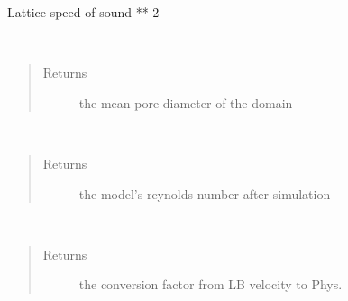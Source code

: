 \documentclass[letterpaper,10pt,english]{sphinxmanual}
\begin{document}
\begin{fulllineitems}
\begin{fulllineitems}
\end{fulllineitems}


\begin{fulllineitems}
\label{\detokenize{index:lb_colloids.LB.LB_2Dpermeability.LB2DModel.cs2}}
 \textendash{} Lattice speed of sound ** 2

\end{fulllineitems}


\begin{fulllineitems}
\label{\detokenize{index:lb_colloids.LB.LB_2Dpermeability.LB2DModel.get_mean_pore_size}}~\begin{quote}\begin{description}
\item[{Returns}] \leavevmode
the mean pore diameter of the domain

\end{description}\end{quote}

\end{fulllineitems}


\begin{fulllineitems}
\label{\detokenize{index:lb_colloids.LB.LB_2Dpermeability.LB2DModel.get_reynolds_number}}~\begin{quote}\begin{description}
\item[{Returns}] \leavevmode
the model’s reynolds number after simulation

\end{description}\end{quote}

\end{fulllineitems}


\begin{fulllineitems}
\label{\detokenize{index:lb_colloids.LB.LB_2Dpermeability.LB2DModel.get_velocity_conversion}}~\begin{quote}\begin{description}
\item[{Returns}] \leavevmode
the conversion factor from LB velocity to Phys.


\end{description}
\end{quote}
\end{fulllineitems}
\end{fulllineitems}
\end{document}
